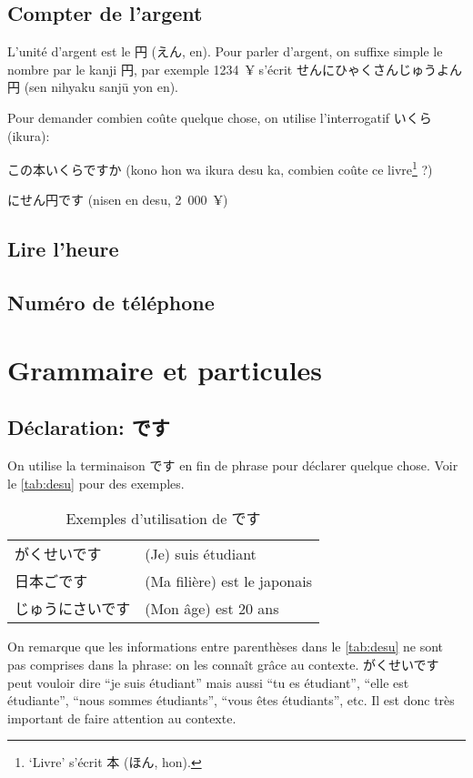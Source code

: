 \documentclass[a4paper,10pt,french,openany]{memoir}
\begin{document}
\section{Compter de l'argent}

L'unité d'argent est le 円 (えん, en). Pour parler d'argent, on suffixe simple le nombre par le kanji 円, par exemple 1234~¥ s'écrit せんにひゃくさんじゅうよん円 (sen nihyaku sanjū yon en).

Pour demander combien coûte quelque chose, on utilise l'interrogatif いくら (ikura):
\begin{cquote}{}
 この本いくらですか (kono hon wa ikura desu ka, combien coûte ce livre\footnote{`Livre' s'écrit 本 (ほん, hon).} ?)
  
 にせん円です (nisen en desu, 2~000~¥)
\end{cquote}

\section{Lire l'heure}

\section{Numéro de téléphone}

\chapter{Grammaire et particules}

\section{Déclaration: です}
On utilise la terminaison です en fin de phrase pour déclarer quelque chose. Voir le \autoref{tab:desu} pour des exemples.

\begin{table}[htbp]
 \centering
 \begin{tabular}{ll}
  がくせいです & (Je) suis étudiant \\
  日本ごです & (Ma filière) est le japonais\\
  じゅうにさいです & (Mon âge) est 20 ans\\
 \end{tabular}
 \caption{Exemples d'utilisation de です}
 \label{tab:desu}
\end{table}

On remarque que les informations entre parenthèses dans le \autoref{tab:desu} ne sont pas comprises dans la phrase: on les connaît grâce au contexte. がくせいです peut vouloir dire ``je suis étudiant'' mais aussi ``tu es étudiant'', ``elle est étudiante'', ``nous sommes étudiants'', ``vous êtes étudiants'', etc. Il est donc très important de faire attention au contexte.
\end{document}
